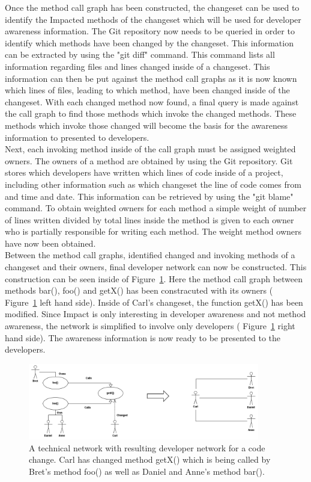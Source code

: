 \documentclass[conference]{IEEEtran}
\begin{document}
Once the method call graph has been constructed, the changeset can be used to identify the Impacted methods
of the changeset which will be used for developer awareness information. The Git repository now needs to be
queried in order to identify which methods have been changed by the changeset. This information can be 
extracted by using the "git diff" command. This command lists all information regarding files and lines
changed inside of a changeset. This information can then be put against the method call graphs as it is now 
known which lines of files, leading to which method, have been changed inside of the changeset. With each
changed method now found, a final query is made against the call graph to find those methods which invoke
the changed methods. These methods which invoke those changed will become the basis for the awareness
information to presented to developers. \\

Next, each invoking method inside of the call graph must be assigned weighted owners. The owners of a method are obtained
by using the Git repository. Git stores which developers have written which lines of code inside of a project, including
other information such as which changeset the line of code comes from and time and date. This information can be
retrieved by using the "git blame" command. To obtain weighted owners for each method a simple weight of number 
of lines written divided by total lines inside the method is given to each owner who is partially responsible for writing
each method. The weight method owners have now been obtained. \\

Between the method call graphs, identified changed and invoking methods of a changeset and their owners,
final developer network can now be constructed. This construction can be seen inside of Figure~\ref{fig:network}.
Here the method call graph between methods bar(), foo() and getX() has been constracuted with its owners
( Figure~\ref{fig:network} left hand side).
Inside of Carl's changeset, the function getX() has been modified. Since Impact is only interesting in developer
awareness and not method awareness, the network is simplified to involve only developers
( Figure~\ref{fig:network} right hand side). The awareness information is now ready to be presented to the
developers. \\

\begin{figure}[tb!]
\centering
\includegraphics[width=0.9\textwidth]{images/TecNetwork}
\caption{A technical network with resulting developer network for a code change. Carl has changed method getX() which is being
called by Bret's method foo() as well as Daniel and Anne's method bar().\label{fig:network}}
\end{figure}
\end{document}
